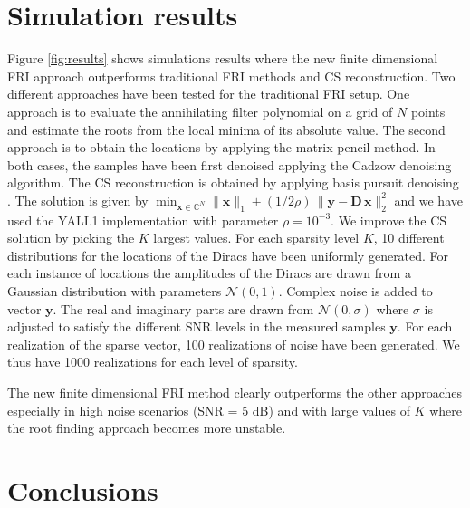 \documentclass{article}
\def\x{{\bm x}}
\def\y{{\bm y}}
\def\D{{\bm D}}
\def\C{{\mathbb C}}
\providecommand{\norm}[1]{\lVert#1\rVert}
\begin{document}

\section{Simulation results}
\label{sec:results}

Figure \ref{fig:results} shows simulations results where the new finite dimensional FRI approach 
outperforms traditional FRI methods and CS reconstruction. 
Two different approaches have been tested for the traditional FRI setup.
One approach is to evaluate the annihilating filter polynomial on a grid of $N$ points and estimate
the roots from the local minima of its absolute value. The second approach is to obtain the locations
by applying the matrix pencil method. In both cases, the samples have been first denoised 
applying the Cadzow denoising algorithm.
The CS reconstruction is obtained by applying basis pursuit denoising \cite{chen1998}.
The solution is given by
$\min_{\x\in\C^N} \norm{\x}_1 + (1/2\rho)\,\norm{\y-\D\,\x}_2^2$ and
we have used the YALL1 implementation \cite{zhang2011} with parameter $\rho=10^{-3}$.
We improve the CS solution by picking the $K$ largest values.
For each sparsity level $K$, 10 different distributions for the locations of the Diracs have been uniformly
generated. For each instance of locations the amplitudes of the Diracs are drawn from a Gaussian distribution
with parameters $\mathcal{N} \left(0,1\right)$. Complex noise is added to vector $\y$. The real and imaginary
parts are drawn from $\mathcal{N} \left(0,\sigma\right)$ where
$\sigma$ is adjusted to satisfy the different SNR levels in the measured samples $\y$. 
For each realization of the sparse vector, 100 realizations of noise have been generated. We thus have 1000
realizations for each level of sparsity.

The new finite dimensional FRI method clearly outperforms the other approaches especially in 
high noise scenarios (SNR = 5 dB) and with large values 
of $K$ where the root finding approach becomes more unstable.




\section{Conclusions}
\label{sec:conclusions}
\end{document}

